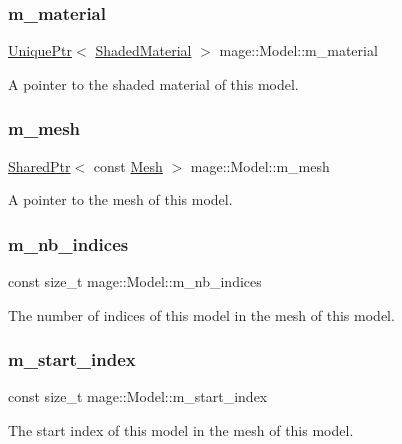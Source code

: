 \subsubsection{\texorpdfstring{m\+\_\+material}{m\_material}}
{\footnotesize\ttfamily \hyperlink{namespacemage_a8c307fbcc33bce9b7f2aa4c26c3b95cf}{Unique\+Ptr}$<$ \hyperlink{structmage_1_1_shaded_material}{Shaded\+Material} $>$ mage\+::\+Model\+::m\+\_\+material\hspace{0.3cm}{\ttfamily [private]}}

A pointer to the shaded material of this model. \hypertarget{classmage_1_1_model_aecd2b4031c5df30fb5f7ed6d62810f73}{}\label{classmage_1_1_model_aecd2b4031c5df30fb5f7ed6d62810f73} 
\subsubsection{\texorpdfstring{m\+\_\+mesh}{m\_mesh}}
{\footnotesize\ttfamily \hyperlink{namespacemage_a1e01ae66713838a7a67d30e44c67703e}{Shared\+Ptr}$<$ const \hyperlink{classmage_1_1_mesh}{Mesh} $>$ mage\+::\+Model\+::m\+\_\+mesh\hspace{0.3cm}{\ttfamily [private]}}

A pointer to the mesh of this model. \hypertarget{classmage_1_1_model_a1fcf80ed9f3002bd2319ef83f073ae75}{}\label{classmage_1_1_model_a1fcf80ed9f3002bd2319ef83f073ae75} 
\subsubsection{\texorpdfstring{m\+\_\+nb\+\_\+indices}{m\_nb\_indices}}
{\footnotesize\ttfamily const size\+\_\+t mage\+::\+Model\+::m\+\_\+nb\+\_\+indices\hspace{0.3cm}{\ttfamily [private]}}

The number of indices of this model in the mesh of this model. \hypertarget{classmage_1_1_model_a63a3e697c9eb1606249de15cc7b818c3}{}\label{classmage_1_1_model_a63a3e697c9eb1606249de15cc7b818c3} 
\subsubsection{\texorpdfstring{m\+\_\+start\+\_\+index}{m\_start\_index}}
{\footnotesize\ttfamily const size\+\_\+t mage\+::\+Model\+::m\+\_\+start\+\_\+index\hspace{0.3cm}{\ttfamily [private]}}

The start index of this model in the mesh of this model. 